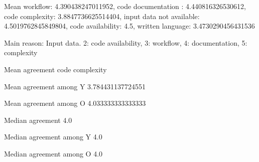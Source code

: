 
Mean workflow: 4.390438247011952, code documentation : 4.440816326530612, code complexity: 3.8847736625514404, input data not available: 4.5019762845849804, code availability: 4.5, written language: 3.4730290456431536

Main reason: Input data. 2: code availability, 3: workflow, 4: documentation, 5: complexity

Mean agreement code complexity

Mean agreement among Y 3.784431137724551

Mean agreement among O 4.033333333333333

Median agreement 4.0

Median agreement among Y 4.0

Median agreement among O 4.0
